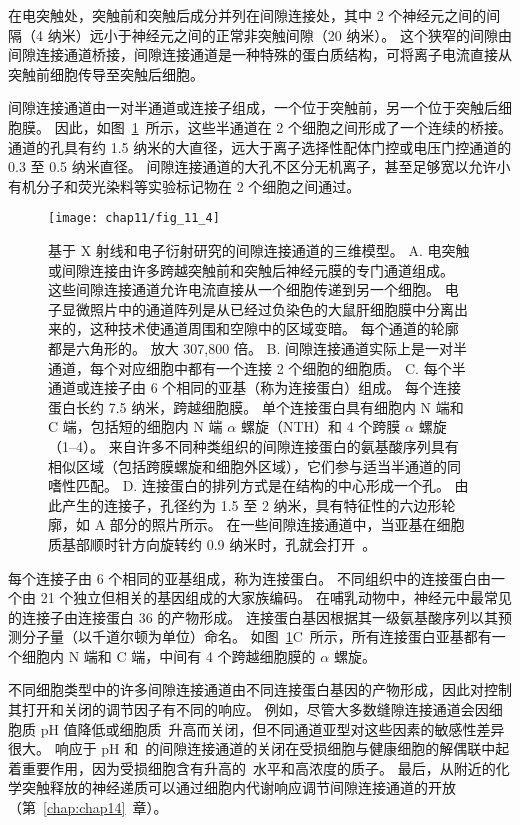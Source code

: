 在电突触处，突触前和突触后成分并列在间隙连接处，其中 2 个神经元之间的间隔（4 纳米）远小于神经元之间的正常非突触间隙（20 纳米）。
这个狭窄的间隙由间隙连接通道桥接，间隙连接通道是一种特殊的蛋白质结构，可将离子电流直接从突触前细胞传导至突触后细胞。


间隙连接通道由一对半通道或连接子组成，一个位于突触前，另一个位于突触后细胞膜。
因此，如图~\ref{fig:11_4}~所示，这些半通道在 2 个细胞之间形成了一个连续的桥接。
通道的孔具有约 1.5 纳米的大直径，远大于离子选择性配体门控或电压门控通道的 0.3 至 0.5 纳米直径。
间隙连接通道的大孔不区分无机离子，甚至足够宽以允许小有机分子和荧光染料等实验标记物在 2 个细胞之间通过。


\begin{figure}[htbp]
	\centering
	\texttt{[image: chap11/fig\_11\_4]}
	\caption{基于 X 射线和电子衍射研究的间隙连接通道的三维模型。
		A. 电突触或间隙连接由许多跨越突触前和突触后神经元膜的专门通道组成。
		这些间隙连接通道允许电流直接从一个细胞传递到另一个细胞。
		电子显微照片中的通道阵列是从已经过负染色的大鼠肝细胞膜中分离出来的，这种技术使通道周围和空隙中的区域变暗。
		每个通道的轮廓都是六角形的。
		放大 307,800 倍。
		B. 间隙连接通道实际上是一对半通道，每个对应细胞中都有一个连接 2 个细胞的细胞质\cite{makowski1977gap}。
		C. 每个半通道或连接子由 6 个相同的亚基（称为连接蛋白）组成。
		每个连接蛋白长约 7.5 纳米，跨越细胞膜。
		单个连接蛋白具有细胞内 N 端和 C 端，包括短的细胞内 N 端 $\alpha$ 螺旋（NTH）和 4 个跨膜 $\alpha$ 螺旋（1–4）。
		来自许多不同种类组织的间隙连接蛋白的氨基酸序列具有相似区域（包括跨膜螺旋和细胞外区域），它们参与适当半通道的同嗜性匹配。
		D. 连接蛋白的排列方式是在结构的中心形成一个孔。
		由此产生的连接子，孔径约为 1.5 至 2 纳米，具有特征性的六边形轮廓，如 A 部分的照片所示。
		在一些间隙连接通道中，当亚基在细胞质基部顺时针方向旋转约 0.9 纳米时，孔就会打开~\cite{unwin1980structure}。}
	\label{fig:11_4}
\end{figure}


每个连接子由 6 个相同的亚基组成，称为连接蛋白。
不同组织中的连接蛋白由一个由 21 个独立但相关的基因组成的大家族编码。
在哺乳动物中，神经元中最常见的连接子由连接蛋白 36 的产物形成。
连接蛋白基因根据其一级氨基酸序列以其预测分子量（以千道尔顿为单位）命名。
如图~\ref{fig:11_4}C~所示，所有连接蛋白亚基都有一个细胞内 N 端和 C 端，中间有 4 个跨越细胞膜的 $\alpha$ 螺旋。


不同细胞类型中的许多间隙连接通道由不同连接蛋白基因的产物形成，因此对控制其打开和关闭的调节因子有不同的响应。
例如，尽管大多数缝隙连接通道会因细胞质 pH 值降低或细胞质~升高而关闭，但不同通道亚型对这些因素的敏感性差异很大。
响应于 pH 和~的间隙连接通道的关闭在受损细胞与健康细胞的解偶联中起着重要作用，因为受损细胞含有升高的~水平和高浓度的质子。
最后，从附近的化学突触释放的神经递质可以通过细胞内代谢响应调节间隙连接通道的开放（第~\ref{chap:chap14}~章）。


